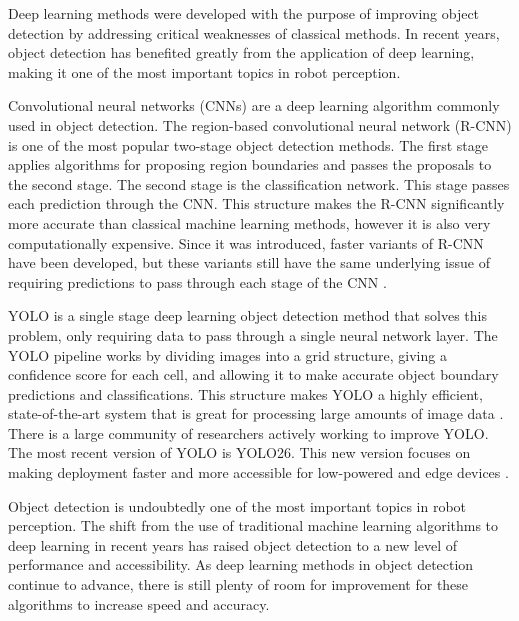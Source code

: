 \documentclass[conference]{IEEEtran}
\begin{document}
\par
Deep learning methods were developed with the purpose of improving object detection by addressing critical weaknesses of classical methods. In recent years, object detection has benefited greatly from the application of deep learning, making it one of the most important topics in robot perception.
\par
Convolutional neural networks (CNNs) are a deep learning algorithm commonly used in object detection. The region-based convolutional neural network (R-CNN) is one of the most popular two-stage object detection methods\cite{gui2024}. The first stage applies algorithms for proposing region boundaries and passes the proposals to the second stage. The second stage is the classification network. This stage passes each prediction through the CNN. This structure makes the R-CNN significantly more accurate than classical machine learning methods, however it is also very computationally expensive. Since it was introduced, faster variants of R-CNN have been developed, but these variants still have the same underlying issue of requiring predictions to pass through each stage of the CNN \cite{gui2024}.
\par
YOLO is a single stage deep learning object detection method that solves this problem, only requiring data to pass through a single neural network layer. The YOLO pipeline works by dividing images into a grid structure, giving a confidence score for each cell, and allowing it to make accurate object boundary predictions and classifications. This structure makes YOLO a highly efficient, state-of-the-art system that is great for processing large amounts of image data \cite{gui2024}. There is a large community of researchers actively working to improve YOLO. The most recent version of YOLO is YOLO26. This new version focuses on making deployment faster and more accessible for low-powered and edge devices \cite{ultralytics}.
\par
Object detection is undoubtedly one of the most important topics in robot perception. The shift from the use of traditional machine learning algorithms to deep learning in recent years has raised object detection to a new level of performance and accessibility. As deep learning methods in object detection continue to advance, there is still plenty of room for improvement for these algorithms to increase speed and accuracy. 
\end{document}
